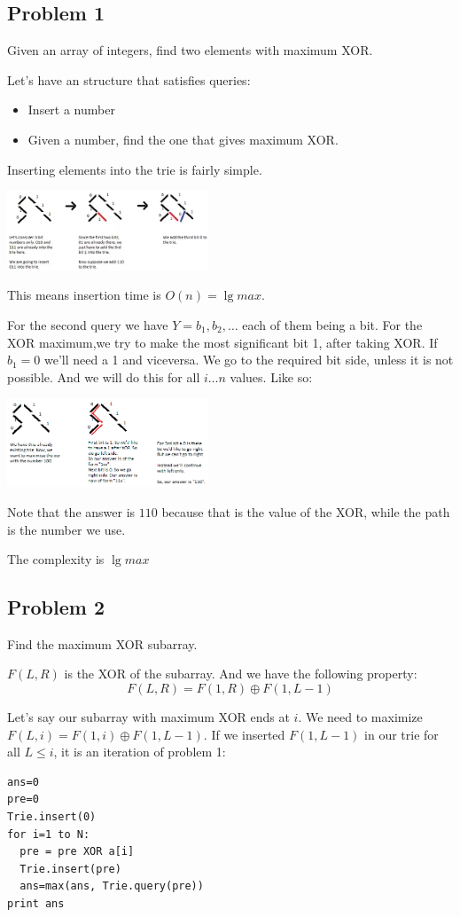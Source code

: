\documentclass{IEEEtran}
\begin{document}
    \subsection{Problem 1}
      Given an array of integers, find two elements with maximum XOR.\par 
      Let's have an structure that satisfies queries:
      \begin{itemize}
        \item Insert a number
        \item Given a number, find the one that gives maximum XOR.
      \end{itemize}
      \par Inserting elements into the trie is fairly simple. 
      \begin{center}
        \includegraphics[width=0.45\textwidth]{trieInsert.png}
      \end{center}
      This means insertion time is $O(n) = \lg{max}$.\par 
      For the second query we have $Y=b_1,b_2,\ldots$ each of them being a bit. For the XOR maximum,we try to make the most significant bit 1, after taking XOR. If $b_1 = 0$ we'll need a 1 and viceversa. We go to the required bit side, unless it is not possible. And we will do this for all $i\ldots n$ values. Like so:
      \begin{center}
        \includegraphics[width=0.45\textwidth]{trieXOR.png}
      \end{center}
      \par Note that the answer is $110$ because that is the value of the XOR, while the path is the number we use.\par 
      The complexity is $\lg{max}$
    \subsection{Problem 2}
      Find the maximum XOR subarray. \par 
      $F(L,R)$ is the XOR of the subarray. And we have the following property:
      $$F(L,R)=F(1,R)\oplus F(1,L-1)$$
      \par Let's say our subarray with maximum XOR ends at $i$. We need to maximize $F(L,i)=F(1,i)\oplus F(1,L-1)$. If we inserted $F(1,L-1)$ in our trie for all $L\leq i$, it is an iteration of problem 1:
      \begin{lstlisting}
ans=0
pre=0
Trie.insert(0)
for i=1 to N:
  pre = pre XOR a[i]
  Trie.insert(pre)
  ans=max(ans, Trie.query(pre))
print ans
      \end{lstlisting}
\end{document}
